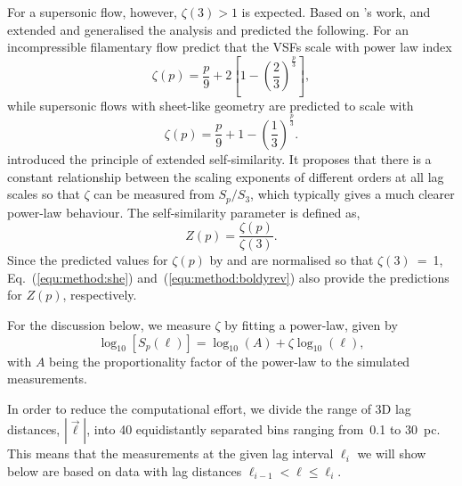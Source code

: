 \documentclass{aa}		%
\begin{document}
For a supersonic flow, however, $\zeta(3) >1$ is expected.
Based on \citeauthor{Kolmogorov1941}'s work, \citet{She1994} and \citet{Boldyrev2002} extended and generalised the analysis and predicted the following.
For an incompressible filamentary flow \citet{She1994} predict that
the VSFs scale with power law index
\begin{equation}
	\zeta(p) = \frac{p}{9} + 2 \left[ 1 - \left( \frac{2}{3} \right)^{\frac{p}{3}} \right] ,
	\label{equ:method:she}
\end{equation}
while supersonic flows with sheet-like geometry are predicted to scale with \citep{Boldyrev2002}
\begin{equation}
	\zeta(p) = \frac{p}{9} + 1 - \left( \frac{1}{3} \right)^{\frac{p}{3}}.
	\label{equ:method:boldyrev}
\end{equation}
\citet{Benzi1993} introduced the principle of extended self-similarity.
It proposes that there is a constant relationship between the scaling
exponents of different orders at all lag scales so that $\zeta$ can be measured from $S_p/S_3$, which typically gives a much clearer power-law behaviour.
The self-similarity parameter is defined as,
\begin{equation}
	Z(p) = \frac{\zeta(p)}{\zeta(3)}.
	\label{equ:method:z_def}
\end{equation} 
Since the predicted values for $\zeta(p)$ by \citet{She1994} and \citet{Boldyrev2002} are normalised so that $\zeta(3)$~=~1, Eq.~(\ref{equ:method:she}) and~(\ref{equ:method:boldyrev}) also provide the predictions for $Z(p)$, respectively.

For the discussion below, we measure $\zeta$ by fitting a power-law,
given by
\begin{equation}
	\log_{10}\left[ S_p(\ell) \right] = \log_{10}\left(A\right) + \zeta \log_{10}(\ell) ,
	\label{equ:method:fitting}
\end{equation}
with $A$ being the proportionality factor of the power-law to the simulated measurements.

In order to reduce the computational effort, we divide the range of 3D lag distances, $|\vec{\ell}|$, into 40 equidistantly separated bins ranging from~0.1 to 30~pc.
This means that the measurements at the given lag interval $\ell_i$ we will show below are based on data with lag distances $\ell_{i-1} < \ell \leq \ell_i$.
\end{document}
